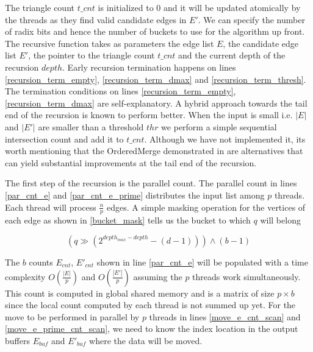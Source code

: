 \documentclass[conference]{IEEEtran}
\begin{document}
The triangle count $t\_cnt$ is initialized to 0 and it will be updated atomically by the threads as they find valid candidate edges in $E'$. We can specify the number of radix bits and hence the number of buckets to use for the algorithm up front. The recursive function takes as parameters the edge list $E$, the candidate edge list $E'$, the pointer to the triangle count $t\_cnt$ and the current depth of the recursion $depth$. Early recursion termination happens on lines \ref{recursion_term_empty}, \ref{recursion_term_dmax} and \ref{recursion_term_thresh}. The termination conditions on lines \ref{recursion_term_empty}, \ref{recursion_term_dmax} are self-explanatory. A hybrid approach towards the tail end of the recursion is known to perform better\cite{b16}. When the input is small i.e. $|E|$ and $|E'|$ are smaller than a threshold $thr$ we perform a simple sequential intersection count and add it to $t\_cnt$. Although we have not implemented it, its worth mentioning that the OrderedMerge demonstrated in \cite{b17, b18} are alternatives that can yield substantial improvements at the tail end of the recursion.

The first step of the recursion is the parallel count. The parallel count in lines \ref{par_cnt_e} and \ref{par_cnt_e_prime} distributes the input list among $p$ threads. Each thread will process $\frac{n}{p}$ edges. A simple masking operation for the vertices of each edge as shown in \ref{bucket_mask} tells us the bucket to which $q$ will belong

\begin{equation}
(q \gg (2^{depth_{max}-depth}-(d-1)))\land(b-1) \label{bucket_mask}
\end{equation}

The $b$ counts $E_{cnt}$, $E'_{cnt}$  shown in line \ref{par_cnt_e} will be populated with a time complexity $O(\frac{|E|}{p})$ and $O(\frac{|E'|}{p})$ assuming the $p$ threads work simultaneously. This count is computed in global shared memory and is a matrix of size $p \times b$ since the local count computed by each thread is not summed up yet. For the move to be performed in parallel by $p$ threads in lines \ref{move_e_cnt_scan} and \ref{move_e_prime_cnt_scan}, we need to know the index location in the output buffers $E_{buf}$ and $E'_{buf}$ where the data will be moved.
\end{document}
